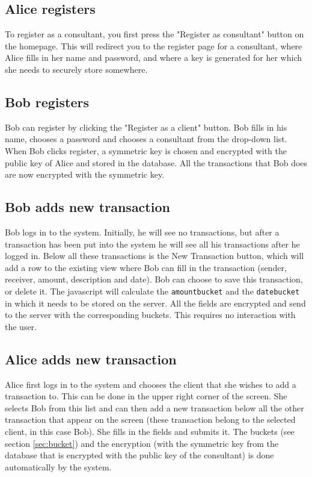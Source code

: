 \documentclass[a4paper]{article}
\begin{document}
    \subsection{Alice registers}
    	To register as a consultant, you first press the "Register as consultant" button on the homepage. This will redirect you to the register page for a consultant, where Alice fills in her name and password, and where a key is generated for her which she needs to securely store somewhere. 
    
    \subsection{Bob registers}
    	Bob can register by clicking the "Register as a client" button. Bob fills in his name, chooses a password and chooses a consultant from the drop-down list. When Bob clicks register, a symmetric key is chosen and encrypted with the public key of Alice and stored in the database. All the transactions that Bob does are now encrypted with the symmetric key. 
        
    \subsection{Bob adds new transaction}
    	Bob logs in to the system. Initially, he will see no transactions, but after a transaction has been put into the system he will see all his transactions after he logged in. Below all these transactions is the New Transaction button, which will add a row to the existing view where Bob can fill in the transaction (sender, receiver, amount, description and date). Bob can choose to save this transaction, or delete it. The javascript will calculate the \texttt{amountbucket} and the \texttt{datebucket} in which it needs to be stored on the server. All the fields are encrypted and send to the server with the corresponding buckets. This requires no interaction with the user.
    
    \subsection{Alice adds new transaction}
    	Alice first logs in to the system and chooses the client that she wishes to add a transaction to. This can be done in the upper right corner of the screen. She selects Bob from this list and can then add a new transaction below all the other transaction that appear on the screen (these transaction belong to the selected client, in this case Bob). She fills in the fields and submits it. The buckets (see section \ref{sec:bucket}) and the encryption (with the symmetric key from the database that is encrypted with the public key of the consultant) is done automatically by the system.
    
\end{document}
